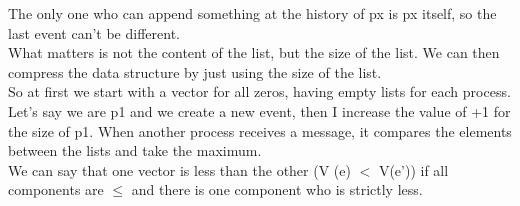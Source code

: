 \documentclass[11pt, a4paper]{article}
\begin{document}
The only one who can append something at the history of px is px itself, so the
last event can't be different.\\
What matters is not the content of the list, but the size of the list. We can then
compress the data structure by just using the size of the list.\\
So at first we start with a vector for all zeros, having empty lists for each process.\\
Let's say we are p1 and we create a new event, then I increase the value of +1 for
the size of p1. When another process receives a message, it compares the elements
between the lists and take the maximum.\\
We can say that one vector is less than the other (V (e) $<$ V(e')) if all components
are $\leq$ and there is one component who is strictly less.
\end{document}
